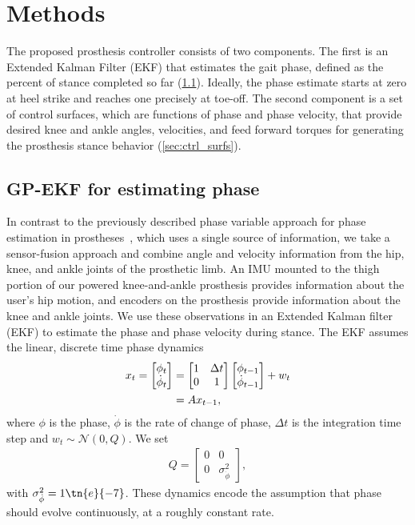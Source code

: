 \section{Methods}\label{sec:methods}

The proposed prosthesis controller consists of two components. The first is an
Extended Kalman Filter (EKF) that estimates the gait phase, defined as the
percent of stance completed so far (\cref{sec:gpekf}). Ideally, the phase
estimate starts at zero at heel strike and reaches one precisely at toe-off. The
second component is a set of control surfaces, which are functions of phase and
phase velocity, that provide desired knee and ankle angles, velocities, and feed
forward torques for generating the prosthesis stance behavior
(\cref{sec:ctrl_surfs}).

\subsection{GP-EKF for estimating phase}\label{sec:gpekf}

In contrast to the previously described phase variable approach for phase
estimation in prostheses~\citep{quintero2016preliminary}, which uses a single
source of information, we take a sensor-fusion approach and combine angle and
velocity information from the hip, knee, and ankle joints of the prosthetic
limb.  An IMU mounted to the thigh portion of our powered knee-and-ankle
prosthesis provides information about the user's hip motion, and encoders on the
prosthesis provide information about the knee and ankle joints. We use these
observations in an Extended Kalman filter (EKF) to estimate the phase and phase
velocity during stance. The EKF assumes the linear, discrete time phase dynamics
\begin{align}
    x_t = \begin{bmatrix} \phi_t \\ \dot{\phi}_t \end{bmatrix} 
        &= \begin{bmatrix} 1 & \Delta t \\ 0 & 1 \end{bmatrix} 
            \begin{bmatrix} \phi_{t-1} \\ \dot{\phi}_{t-1} \end{bmatrix} + w_t
            \label{eq:dyn_mdl} \\
        &= A x_{t-1}, \notag
\end{align}
where $\phi$ is the phase, $\dot{\phi}$ is the rate of change of phase, $\Delta
t$ is the integration time step and $w_t \sim \mathcal{N}(0, Q)$. We set
\begin{align}
    Q = \begin{bmatrix} 0 & 0 \\ 0 & \sigma_{\dot{\phi}}^2 \end{bmatrix},
\end{align}
with $\sigma_{\dot{\phi}}^2 = 1\tn{e}{-7}$. These dynamics encode the
assumption that phase should evolve continuously, at a roughly constant rate.

